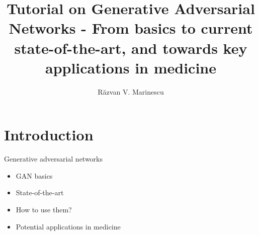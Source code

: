\documentclass[8pt,xcolor=table,aspectratio=169]{beamer}
\title{Tutorial on Generative Adversarial Networks  - From basics to current state-of-the-art, and towards key applications in medicine}
\author[Raz]{
R\u{a}zvan V. Marinescu\vspace{1em}}
\institute{\small{Medical Vision Group, Massachusetts Institute of Technology}

}
\date{}
\begin{document}
 
\section{Introduction}

\frame{\titlepage}
 











\begin{frame}{Generative adversarial networks}
 
 \begin{itemize}
 
\item GAN basics
  
  \vspace{2em}
  
\item State-of-the-art
  
  \vspace{2em}
  
\item How to use them?
  
  \vspace{2em}
  
\item Potential applications in medicine
  
  \vspace{2em}
 \end{itemize}

\end{frame}
\end{document}
